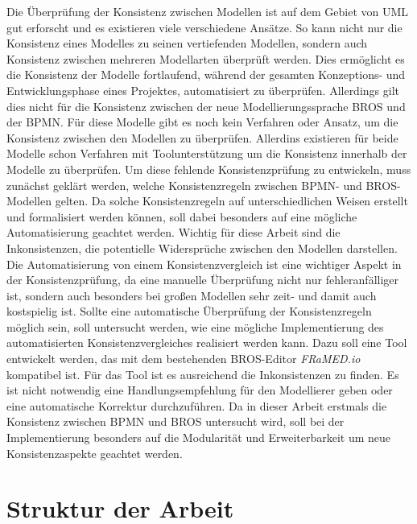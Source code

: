Die Überprüfung der Konsistenz zwischen Modellen ist auf dem Gebiet von UML gut erforscht und es existieren viele verschiedene Ansätze.
So kann nicht nur die Konsistenz eines Modelles zu seinen vertiefenden Modellen, sondern auch Konsistenz zwischen mehreren Modellarten überprüft werden.
Dies ermöglicht es die Konsistenz der Modelle fortlaufend, während der gesamten Konzeptions- und Entwicklungsphase eines Projektes, automatisiert zu überprüfen. 
Allerdings gilt dies nicht für die Konsistenz zwischen der neue Modellierungssprache BROS und der BPMN.
Für diese Modelle gibt es noch kein Verfahren oder Ansatz, um die Konsistenz zwischen den Modellen zu überprüfen.
Allerdins existieren für beide Modelle schon Verfahren mit Toolunterstützung um die Konsistenz innerhalb der Modelle zu überprüfen.
Um diese fehlende Konsistenzprüfung zu entwickeln, muss zunächst geklärt werden, welche Konsistenzregeln zwischen BPMN- und BROS-Modellen gelten.
Da solche Konsistenzregeln auf unterschiedlichen Weisen erstellt und formalisiert werden können, soll dabei besonders auf eine mögliche Automatisierung geachtet werden.
Wichtig für diese Arbeit sind die Inkonsistenzen, die potentielle Widersprüche zwischen den Modellen darstellen. 
Die Automatisierung von einem Konsistenzvergleich ist eine wichtiger Aspekt in der Konsistenzprüfung, da eine manuelle Überprüfung nicht nur fehleranfälliger ist, sondern auch besonders bei großen Modellen sehr zeit- und damit auch kostspielig ist.
Sollte eine automatische Überprüfung der Konsistenzregeln möglich sein, soll untersucht werden, wie eine mögliche Implementierung des automatisierten Konsistenzvergleiches realisiert werden kann.
Dazu soll eine Tool entwickelt werden, das mit dem bestehenden BROS-Editor \emph{FRaMED.io} kompatibel ist.
Für das Tool ist es ausreichend die Inkonsistenzen zu finden.
Es ist nicht notwendig eine Handlungsempfehlung für den Modellierer geben oder eine automatische Korrektur durchzuführen. 
Da in dieser Arbeit erstmals die Konsistenz zwischen BPMN und BROS untersucht wird, soll bei der Implementierung besonders auf die Modularität und Erweiterbarkeit um neue Konsistenzaspekte geachtet werden.

\section{Struktur der Arbeit}

